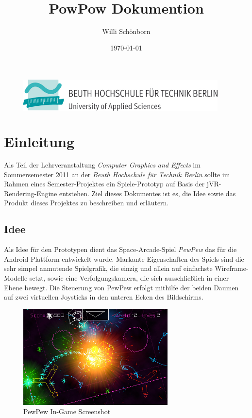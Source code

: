 \documentclass[a4paper]{article}
\title{PowPow Dokumention}
\author{Willi Schönborn}
\date{\today}
\begin{document}
\begin{figure}[H]
\centering
\includegraphics{beuth.png}
\maketitle
\end{figure}

\newpage
\tableofcontents

\newpage
\section{Einleitung}
Als Teil der Lehrveranstaltung \textit{Computer Graphics and Effects} im Sommersemester 2011 an der \textit{Beuth Hochschule für Technik Berlin} sollte im Rahmen eines Semester-Projektes ein Spiele-Prototyp auf Basis der jVR-Rendering-Engine entstehen. Ziel dieses Dokumentes ist es, die Idee sowie das Produkt dieses Projektes zu beschreiben und erläutern.

\subsection{Idee}
Als Idee für den Prototypen dient das Space-Arcade-Spiel \textit{PewPew} das für die Android-Plattform entwickelt wurde. Markante Eigenschaften des Spiels sind die sehr simpel anmutende Spielgrafik, die einzig und allein auf  einfachste Wireframe-Modelle setzt, sowie eine Verfolgungskamera, die sich ausschließlich in einer Ebene bewegt. Die Steuerung von PewPew erfolgt mithilfe der beiden Daumen auf zwei virtuellen Joysticks in den unteren Ecken des Bildschirms.

\begin{figure}[H]
\centering
\includegraphics[width=0.7\textwidth]{PewPew-iPhone-App-Review.jpg}
\caption{PewPew In-Game Screenshot}
\end{figure}
\end{document}
